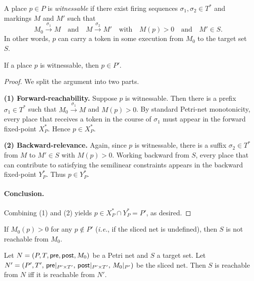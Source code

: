 \begin{definition}
	A place $p\in P$ is \emph{witnessable} if there exist firing
	sequences $\sigma_1,\sigma_2\in T^*$ and markings $M$ and $M'$ such that
	\[
	M_0 \xrightarrow{\sigma_1} M
	\quad\text{and}\quad
	M \xrightarrow{\sigma_2} M'
	\quad\text{with}\quad
	M(p)>0
	\quad\text{and}\quad
	M'\in S.
	\]
	In other words, $p$ can carry a token in some execution from $M_0$ to the target set $S$.
\end{definition}

\begin{theorem}
	\label{thm:invariant}
	If a place $p$ is witnessable, then $p\in P'$.
\end{theorem}

\begin{proof}
	We split the argument into two parts.
	
	\medskip
	\noindent
	\textbf{(1) Forward-reachability.}
	Suppose $p$ is witnessable.  Then there is a prefix
	$\sigma_1\in T^*$ such that $M_0\xrightarrow{\sigma_1}M$ and
	$M(p)>0$.  By standard Petri-net monotonicity, every place that
	receives a token in the course of $\sigma_1$ must appear in the
	forward fixed-point $X^*_P$.  Hence $p\in X^*_P$.
	
	\medskip
	\noindent
	\textbf{(2) Backward-relevance.}
	Again, since $p$ is witnessable, there is a suffix
	$\sigma_2\in T^*$ from $M$ to $M'\in S$ with $M(p)>0$.  Working
	backward from $S$, every place that can contribute to satisfying the
	semilinear constraints appears in the backward fixed-point $Y^*_P$.
	Thus $p\in Y^*_P$.
	
	\paragraph{Conclusion.}
	Combining (1) and (2) yields $p\in X^*_P\cap Y^*_P = P'$, as desired.
\end{proof}

\begin{corollary}
  If $M_0(p) > 0$ for any $p \not\in P'$ (\textit{i.e.}, if the sliced net is undefined), then $S$ is not reachable from $M_0$.
\end{corollary}

\begin{corollary}
	Let $N = (P, T, \mathsf{pre}, \mathsf{post}, M_0)$ be a Petri net and $S$ a target set.  
	Let $N' = (P',T',\,\mathsf{pre}|_{P'\times T'},\,\mathsf{post}|_{P'\times T'},\,M_0|_{P'})$ be the sliced net.  
	Then $S$ is reachable from $N$ iff it is reachable from $N'$.
\end{corollary}

